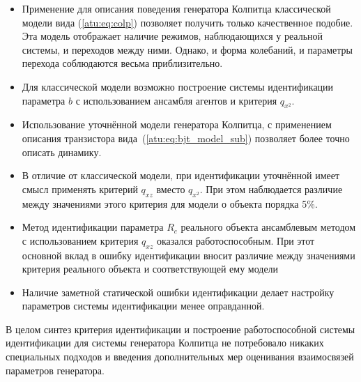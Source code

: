 \begin{itemize}

  \item
    Применение для описания поведения генератора Колпитца классической модели вида
    (\ref{atu:eq:colp}) позволяет получить только качественное подобие.
    Эта модель отображает наличие режимов, наблюдающихся у реальной системы,
    и переходов между ними. Однако, и форма колебаний,
    и параметры перехода соблюдаются весьма приблизительно.

  \item
    Для классической модели возможно построение системы идентификации параметра $b$
    с использованием ансамбля агентов и критерия $q_{x^2}$.

  \item
    Использование уточнённой модели генератора Колпитца, с применением
    описания транзистора вида~(\ref{atu:eq:bjt_model_sub})
    позволяет более точно описать динамику.

  \item
    В отличие от классической модели, при идентификации уточнённой
    имеет смысл применять критерий $q_{xz}$ вместо $q_{x^2}$.
    При этом наблюдается различие между значениями этого критерия
    для модели о объекта порядка 5\%.

  \item
    Метод идентификации параметра $R_c$ реального объекта ансамблевым методом
    с использованием критерия $q_{xz}$ оказался
    работоспособным. При этот основной вклад
    в ошибку идентификации вносит различие между значениями критерия
    реального объекта и соответствующей ему модели

  \item
    Наличие заметной статической ошибки идентификации
    делает настройку параметров системы идентификации менее оправданной.

\end{itemize}


В целом синтез критерия идентификации и построение работоспособной системы идентификации для
системы генератора Колпитца не потребовало никаких специальных подходов и введения дополнительных
мер оценивания взаимосвязей параметров генератора.


